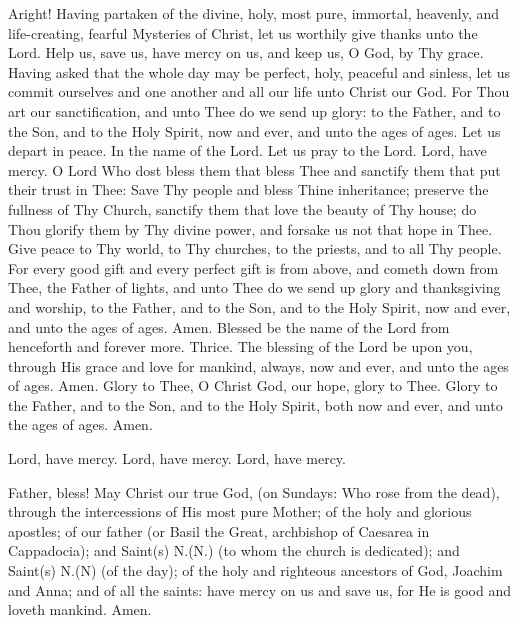 \begin{liturgicaltext}
    \deacon Aright! Having partaken of the divine, holy, most pure, immortal, heavenly, and life-creating, fearful Mysteries of Christ, let us worthily give thanks unto the Lord. 
    \choir {}
    \deacon Help us, save us, have mercy on us, and keep us, O God, by Thy grace. 
    \choir {}
    \deacon Having asked that the whole day may be perfect, holy, peaceful and sinless, let us commit ourselves and one another and all our life unto Christ our God. 
    \choir {}
    \priest For Thou art our sanctification, and unto Thee do we send up glory: to the Father, and to the Son, and to the Holy Spirit, now and ever, and unto the ages of ages.
    \choir {}
    \priest Let us depart in peace. 
    \choir In the name of the Lord.
    \deacon Let us pray to the Lord.
    \choir Lord, have mercy.
    \priest O Lord Who dost bless them that bless Thee and sanctify them that put their trust in Thee: Save Thy people and bless Thine inheritance; preserve the fullness of Thy Church, sanctify them that love the beauty of Thy house; do Thou glorify them by Thy divine power, and forsake us not that hope in Thee. Give peace to Thy world, to Thy churches, to the priests, and to all Thy people. For every good gift and every perfect gift is from above, and cometh down from Thee, the Father of lights, and unto Thee do we send up glory and thanksgiving and worship, to the Father, and to the Son, and to the Holy Spirit, now and ever, and unto the ages of ages.
    \choir Amen. Blessed be the name of the Lord from henceforth and forever more. Thrice.
    \priest The blessing of the Lord be upon you, through His grace and love for mankind, always, now and ever, and unto the ages of ages.
    \choir Amen.
    \priest Glory to Thee, O Christ God, our hope, glory to Thee.
    \choir Glory to the Father, and to the Son, and to the Holy Spirit, both now and ever, and unto the ages of ages. Amen.
    \item[] Lord, have mercy. Lord, have mercy. Lord, have mercy.
    \item[] Father, bless!
    \priest May Christ our true God, (on Sundays: Who rose from the dead), through the intercessions of His most pure Mother; of the holy and glorious apostles; of our father (or Basil the Great, archbishop of Caesarea in Cappadocia); and Saint(s) N.(N.) (to whom the church is dedicated); and Saint(s) N.(N) (of the day); of the holy and righteous ancestors of God, Joachim and Anna; and of all the saints: have mercy on us and save us, for He is good and loveth mankind.
    \choir Amen.
\end{liturgicaltext}